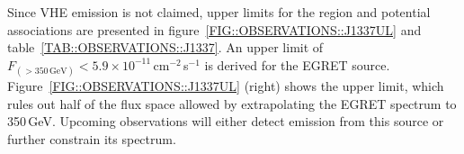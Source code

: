 Since VHE emission is not claimed, upper limits for the region and
potential associations are presented in
figure~\ref{FIG::OBSERVATIONS::J1337UL} and
table~\ref{TAB::OBSERVATIONS::J1337}. An upper limit of
$F_{(>350\,\mathrm{GeV})}<5.9\times10^{-11}$\,cm$^{-2}$\,s$^{-1}$ is
derived for the EGRET source. 
Figure~\ref{FIG::OBSERVATIONS::J1337UL} (right) shows the upper limit,
which rules out half of the flux space allowed by extrapolating the
EGRET spectrum to 350\,GeV. Upcoming observations will either detect
emission from this source or further constrain its spectrum.


